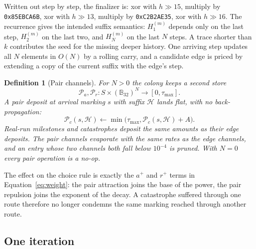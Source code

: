 \documentclass[11pt,a4paper]{article}
\newtheorem{definition}{Definition}[section]
\newcommand{\TS}{\mathcal{H}}
\newcommand{\Pair}{\mathcal{P}}
\newcommand{\Tau}{\tau_{\max}}
\newcommand{\B}{\mathbb{B}_{32}}
\begin{document}
Written out step by step, the finalizer is: xor with $h\gg15$, multiply by
\texttt{0x85EBCA6B}, xor with $h\gg13$, multiply by \texttt{0xC2B2AE35}, xor
with $h\gg16$.  The recurrence gives the intended suffix semantics:
$H_1^{(m)}$ depends only on the last step, $H_2^{(m)}$ on the last two, and
$H_N^{(m)}$ on the last $N$ steps.  A trace shorter than $k$ contributes the
seed for the missing deeper history.  One arriving step updates all $N$
elements in $O(N)$ by a rolling carry, and a candidate edge is priced by
extending a copy of the current suffix with the edge's step.

\begin{definition}[Pair channels]\label{def:pairs}
For $N>0$ the colony keeps a second store
\[
  \Pair_a,\Pair_r\colon S\times(\B)^{N}\to[0,\Tau].
\]
A pair deposit at arrival marking $s$ with suffix $\TS$ lands flat, with no
back-propagation:
\[
  \Pair_c(s,\TS)\leftarrow
  \min\bigl(\Tau,\Pair_c(s,\TS)+A\bigr).
\]
Real-run milestones and catastrophes deposit the same amounts as their edge
deposits.  The pair channels evaporate with the same rates as the edge
channels, and an entry whose two channels both fall below $10^{-4}$ is
pruned.  With $N=0$ every pair operation is a no-op.
\end{definition}

The effect on the choice rule is exactly the $a^{+}$ and $r^{+}$ terms in
Equation~\eqref{eq:weight}: the pair attraction joins the base of the power,
the pair repulsion joins the exponent of the decay.  A catastrophe suffered
through one route therefore no longer condemns the same marking reached
through another route.

\subsection{One iteration}\label{sec:iteration}
\end{document}
